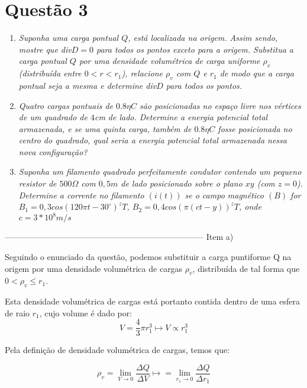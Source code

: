 \documentclass[journal,comsoc]{IEEEtran}
\begin{document}
\section{Questão 3}
    \begin{enumerate}
    	\item{\textit{Suponha uma carga pontual $Q$, está localizada na origem. Assim sendo, mostre que div$D=0$ para todos os pontos exceto para a origem. Substitua a carga pontual $Q$ por uma densidade volumétrica de carga uniforme $\rho_v$ (distribuída entre $0<r<r_1$), relacione $\rho_v$ com $Q$ e $r_1$ de modo que a carga pontual seja a mesma e determine div$D$ para todos os pontos.}}
        \item{\textit{Quatro cargas pontuais de $0.8\eta C$ são posicionadas no espaço livre nos vértices de um quadrado de $4$cm de lado. Determine a energia potencial total armazenada, e se uma quinta carga, também de $0.8\eta C$ fosse posicionada no centro do quadrado, qual seria a energia potencial total armazenada nessa nova configuração?}}
        \item{\textit{Suponha um filamento quadrado perfeitamente condutor contendo um pequeno resistor de $500\Omega$ com $0,5m$ de lado posicionado sobre o plano $xy$ (com $z=0$). Determine a corrente no filamento $(i(t))$ se o campo magnético $(B)$ for $B_1=0,3cos(120\pi t-30^{\circ})^{z} T$, $B_2=0,4cos(\pi(ct-y))^{z} T$, onde $c=3*10^{8}m/s$ }}
    \end{enumerate}
    \hfill
    
------------------------------------------------------------------------
Item a)
\par Seguindo o enunciado da questão, podemos substituir a carga puntiforme Q na origem por uma densidade volumétrica de cargas $\rho_{v}$, distribuída de tal forma que $0 < \rho_{v}\leq r_{1}$.
\par Esta densidade volumétrica de cargas está portanto contida dentro de uma esfera de raio $r_{1}$, cujo volume é dado por:
\begin{equation}
	V = \frac{4}{3}\pi r_{1}^3  \longmapsto V \propto r_{1}^3
\end{equation}

\par Pela definição de densidade volumétrica de cargas, temos que:

\begin{equation}
	\rho_{v} = \lim_{V \to 0} \frac{\Delta Q}{\Delta V} \longmapsto = \lim_{r_{1} \to 0} \frac{\Delta Q}{\Delta r_{1}}
\end{equation}
\end{document}

